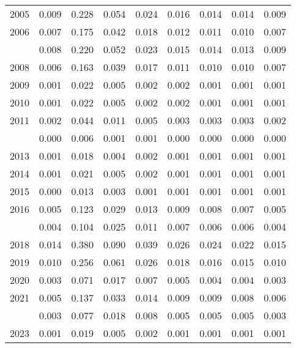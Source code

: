 \documentclass[
]{article}
\begin{document}
\begin{longtable}[t]{lrrrrrrrr}
2005 & 0.009 & 0.228 & 0.054 & 0.024 & 0.016 & 0.014 & 0.014 & 0.009\\
2006 & 0.007 & 0.175 & 0.042 & 0.018 & 0.012 & 0.011 & 0.010 & 0.007\\
\addlinespace
2007 & 0.008 & 0.220 & 0.052 & 0.023 & 0.015 & 0.014 & 0.013 & 0.009\\
2008 & 0.006 & 0.163 & 0.039 & 0.017 & 0.011 & 0.010 & 0.010 & 0.007\\
2009 & 0.001 & 0.022 & 0.005 & 0.002 & 0.002 & 0.001 & 0.001 & 0.001\\
2010 & 0.001 & 0.022 & 0.005 & 0.002 & 0.002 & 0.001 & 0.001 & 0.001\\
2011 & 0.002 & 0.044 & 0.011 & 0.005 & 0.003 & 0.003 & 0.003 & 0.002\\
\addlinespace
2012 & 0.000 & 0.006 & 0.001 & 0.001 & 0.000 & 0.000 & 0.000 & 0.000\\
2013 & 0.001 & 0.018 & 0.004 & 0.002 & 0.001 & 0.001 & 0.001 & 0.001\\
2014 & 0.001 & 0.021 & 0.005 & 0.002 & 0.001 & 0.001 & 0.001 & 0.001\\
2015 & 0.000 & 0.013 & 0.003 & 0.001 & 0.001 & 0.001 & 0.001 & 0.001\\
2016 & 0.005 & 0.123 & 0.029 & 0.013 & 0.009 & 0.008 & 0.007 & 0.005\\
\addlinespace
2017 & 0.004 & 0.104 & 0.025 & 0.011 & 0.007 & 0.006 & 0.006 & 0.004\\
2018 & 0.014 & 0.380 & 0.090 & 0.039 & 0.026 & 0.024 & 0.022 & 0.015\\
2019 & 0.010 & 0.256 & 0.061 & 0.026 & 0.018 & 0.016 & 0.015 & 0.010\\
2020 & 0.003 & 0.071 & 0.017 & 0.007 & 0.005 & 0.004 & 0.004 & 0.003\\
2021 & 0.005 & 0.137 & 0.033 & 0.014 & 0.009 & 0.009 & 0.008 & 0.006\\
\addlinespace
2022 & 0.003 & 0.077 & 0.018 & 0.008 & 0.005 & 0.005 & 0.005 & 0.003\\
2023 & 0.001 & 0.019 & 0.005 & 0.002 & 0.001 & 0.001 & 0.001 & 0.001\\*
\end{longtable}
\end{document}
